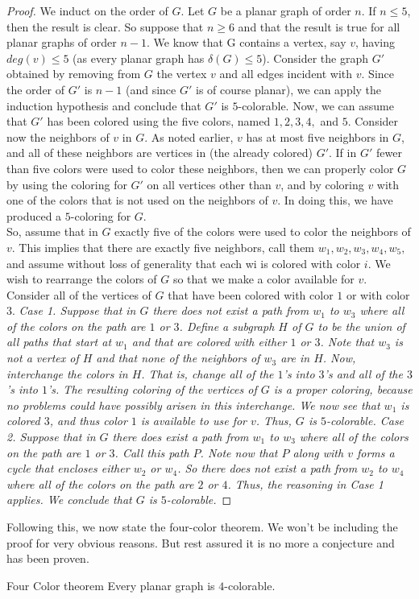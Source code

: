 \documentclass[../basic_graph_theory.tex]{subfiles}
\begin{document}
\begin{proof}
    We induct on the order of $G$. Let $G$ be a planar graph of order $n$. If $n \le 5$, then the result is clear. So suppose that $n \ge 6$ and that the result is true for all planar graphs of order $n - 1$. We know that G contains a vertex, say $v$, having $deg(v) \le 5$ (as every planar graph has $\delta(G) \le 5$).
    \ssk
    Consider the graph $G'$ obtained by removing from $G$ the vertex $v$ and all edges incident with $v$. Since the order of $G'$ is $n - 1$ (and since $G'$ is of course planar), we can apply the induction hypothesis and conclude that $G'$ is $5$-colorable. Now, we can assume that $G'$ has been colored using the five colors, named $1,2,3,4,$ and $5$. Consider now the neighbors of $v$ in $G$. As noted earlier, $v$ has at most five neighbors in $G$, and all of these neighbors are vertices in (the already colored) $G'$.
    \ssk
    If in $G'$ fewer than five colors were used to color these neighbors, then we can properly color $G$ by using the coloring for $G'$ on all vertices other than $v$, and by coloring $v$ with one of the colors that is not used on the neighbors of $v$. In doing this, we have produced a $5$-coloring for $G$.\\
    So, assume that in $G$ exactly five of the colors were used to color the neighbors of $v$. This implies that there are exactly five neighbors, call them $w_1, w_2, w_3, w_4, w_5,$ and assume without loss of generality that each wi is colored with color $i$.
    \ssk
    We wish to rearrange the colors of $G$ so that we make a color available for $v$. Consider all of the vertices of $G$ that have been colored with color $1$ or with color $3$.
    \ssk
    \em{Case 1.} Suppose that in $G$ there does not exist a path from $w_1$ to $w_3$ where all of the colors on the path are $1$ or $3$. Define a subgraph $H$ of $G$ to be the union of all paths that start at $w_1$ and that are colored with either $1$ or $3$. Note that $w_3$ is not a vertex of $H$ and that none of the neighbors of $w_3$ are in $H$. Now, interchange the colors in $H$. That is, change all of the $1$'s into $3$'s and all of the $3$'s into $1$'s. The resulting coloring of the vertices of $G$ is a proper coloring, because no problems could have possibly arisen in this interchange. We now see that $w_1$ is colored $3$, and thus color $1$ is available to use for $v$. Thus, $G$ is $5$-colorable.
    \ssk
    \em{Case 2.} Suppose that in $G$ there does exist a path from $w_1$ to $w_3$ where all of the colors on the path are $1$ or $3$. Call this path $P$. Note now that $P$ along with $v$ forms a cycle that encloses either $w_2$ or $w_4$. So there does not exist a path from $w_2$ to $w_4$ where all of the colors on the path are $2$ or $4$. Thus, the reasoning in \em{Case 1} applies. We conclude that $G$ is $5$-colorable.
\end{proof}

Following this, we now state the four-color theorem. We won't be including the proof for very obvious reasons. But rest assured it is no more a conjecture and has been proven.
\begin{Thm}{Four Color theorem}{}
    Every planar graph is $4$-colorable.
\end{Thm}
\end{document}

